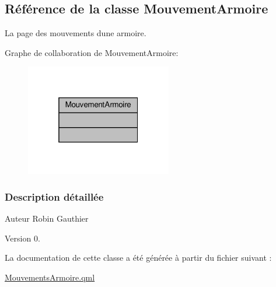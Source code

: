\hypertarget{class_mouvement_armoire}{}\subsection{Référence de la classe Mouvement\+Armoire}
\label{class_mouvement_armoire}


La page des mouvements d\textquotesingle{}une armoire.  




Graphe de collaboration de Mouvement\+Armoire\+:
\nopagebreak
\begin{figure}[H]
\begin{center}
\leavevmode
\includegraphics[width=181pt]{class_mouvement_armoire__coll__graph}
\end{center}
\end{figure}


\subsubsection{Description détaillée}
\begin{DoxyAuthor}{Auteur}
Robin Gauthier
\end{DoxyAuthor}
\begin{DoxyVersion}{Version}
0. 
\end{DoxyVersion}


La documentation de cette classe a été générée à partir du fichier suivant \+:\begin{DoxyCompactItemize}
\item 
\hyperlink{_mouvements_armoire_8qml}{Mouvements\+Armoire.\+qml}\end{DoxyCompactItemize}
